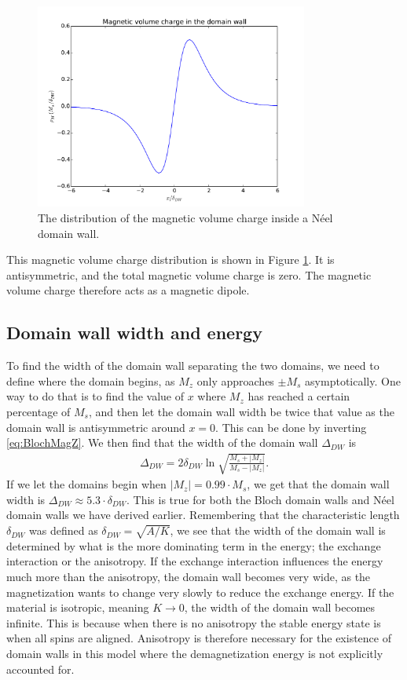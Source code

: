 \documentclass[12pt, a4paper, twoside, openright]{article}		%
\numberwithin{equation}{section}
\begin{document}
\begin{figure}[h!]
\begin{center}
\includegraphics[width=0.8\textwidth]{Figures/MagneticVolumeCharge.pdf} 
\caption{The distribution of the magnetic volume charge inside a N\'{e}el domain wall.}
\label{fig:magVolumeCharge} 
\end{center}
\end{figure}
This magnetic volume charge distribution is shown in Figure \ref{fig:magVolumeCharge}. It is antisymmetric, and the total magnetic volume charge is zero. The magnetic volume charge therefore acts as a magnetic dipole.

\subsection{Domain wall width and energy}
To find the width of the domain wall separating the two domains, we need to define where the domain begins, as $M_z$ only approaches $\pm M_s$ asymptotically. One way to do that is to find the value of $x$ where $M_z$ has reached a certain percentage of $M_s$, and then let the domain wall width be twice that value as the domain wall is antisymmetric around $x=0$. This can be done by inverting \eqref{eq:BlochMagZ}. We then find that the width of the domain wall $\Delta_{DW}$ is
\begin{align}
\Delta_{DW} = 2\delta_{DW}\ln\sqrt{\frac{M_s+|M_z|}{M_s-|M_z|}}.
\end{align}
If we let the domains begin when $|M_z| = 0.99\cdot M_s$, we get that the domain wall width is $\Delta_{DW} \approx 5.3 \cdot \delta_{DW}$. This is true for both the Bloch domain walls and N\'{e}el domain walls we have derived earlier. Remembering that the characteristic length $\delta_{DW}$ was defined as $\delta_{DW} = \sqrt{A/K}$, we see that the width of the domain wall is determined by what is the more dominating term in the energy; the exchange interaction or the anisotropy. If the exchange interaction influences the energy much more than the anisotropy, the domain wall becomes very wide, as the magnetization wants to change very slowly to reduce the exchange energy. If the material is isotropic, meaning $K\rightarrow0$, the width of the domain wall becomes infinite. This is because when there is no anisotropy the stable energy state is when all spins are aligned. Anisotropy is therefore necessary for the existence of domain walls in this model where the demagnetization energy is not explicitly accounted for.
\end{document}
